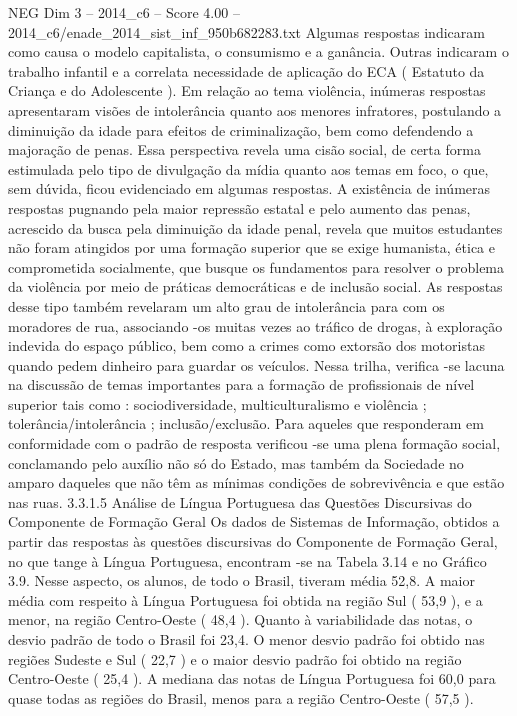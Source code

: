 \begin{textsample}{NEG Dim 3 – 2014\_c6 – Score 4.00 – 2014\_c6/enade\_2014\_sist\_inf\_950b682283.txt}
Algumas respostas indicaram como causa o modelo capitalista, o consumismo e a ganância.
Outras indicaram o trabalho infantil e a correlata necessidade de aplicação do ECA ( Estatuto da Criança e do Adolescente ).
Em relação ao tema violência, inúmeras respostas apresentaram visões de intolerância quanto aos menores infratores, postulando a diminuição da idade para efeitos de criminalização, bem como defendendo a majoração de penas.
Essa perspectiva revela uma cisão social, de certa forma estimulada pelo tipo de divulgação da mídia quanto aos temas em foco, o que, sem dúvida, ficou evidenciado em algumas respostas.
A existência de inúmeras respostas pugnando pela maior repressão estatal e pelo aumento das penas, acrescido da busca pela diminuição da idade penal, revela que muitos estudantes não foram atingidos por uma formação superior que se exige humanista, ética e comprometida socialmente, que busque os fundamentos para resolver o problema da violência por meio de práticas democráticas e de inclusão social.
As respostas desse tipo também revelaram um alto grau de intolerância para com os moradores de rua, associando -os muitas vezes ao tráfico de drogas, à exploração indevida do espaço público, bem como a crimes como extorsão dos motoristas quando pedem dinheiro para guardar os veículos.
Nessa trilha, verifica -se lacuna na discussão de temas importantes para a formação de profissionais de nível superior tais como : sociodiversidade, multiculturalismo e violência ; tolerância/intolerância ; inclusão/exclusão.
Para aqueles que responderam em conformidade com o padrão de resposta verificou -se uma plena formação social, conclamando pelo auxílio não só do Estado, mas também da Sociedade no amparo daqueles que não têm as mínimas condições de sobrevivência e que estão nas ruas. 3.3.1.5 Análise de Língua Portuguesa das Questões Discursivas do Componente de Formação Geral Os dados de Sistemas de Informação, obtidos a partir das respostas às questões discursivas do Componente de Formação Geral, no que tange à Língua Portuguesa, encontram -se na Tabela 3.14 e no Gráfico 3.9.
Nesse aspecto, os alunos, de todo o Brasil, tiveram média 52,8.
A maior média com respeito à Língua Portuguesa foi obtida na região Sul ( 53,9 ), e a menor, na região Centro-Oeste ( 48,4 ).
Quanto à variabilidade das notas, o desvio padrão de todo o Brasil foi 23,4.
O menor desvio padrão foi obtido nas regiões Sudeste e Sul ( 22,7 ) e o maior desvio padrão foi obtido na região Centro-Oeste ( 25,4 ).
A mediana das notas de Língua Portuguesa foi 60,0 para quase todas as regiões do Brasil, menos para a região Centro-Oeste ( 57,5 ).

\end{textsample}

